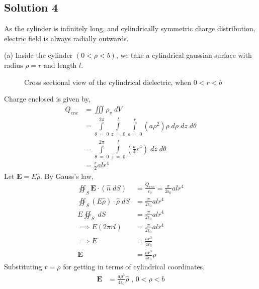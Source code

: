 \documentclass[12pt]{article}
\providecommand{\brak}[1]{\ensuremath{\left(#1\right)}}
\begin{document}
\subsection*{Solution 4}
As the cylinder is infinitely long, and cylindrically symmetric charge distribution, electric field is always radially outwards. 

(a) Inside the cylinder $\brak{0 < \rho < b}$, we take a cylindrical gaussian surface with radius $\rho = r$ and length $l$.
\begin{figure}[!ht]
\centering
{}%

\label{fig:my_label}
\caption{Cross sectional view of the cylindrical dielectric, when $0 < r < b$}
\end{figure}
Charge enclosed is given by,
\begin{align*}
    Q_{enc} &= \iiint \rho_v \;dV\\
    &= \int\limits_{\theta \;=\; 0}^{2\pi} \int\limits_{z \;=\; 0}^{l} \int\limits_{\rho \;=\; 0}^{r} \brak{a\rho^2} \rho \;d\rho \;dz \;d\theta\\
    &= \int\limits_{\theta \;=\; 0}^{2\pi} \int\limits_{z \;=\; 0}^{l} \brak{\frac{a}{4}r^4}\;dz \;d\theta\\
    &= \frac{\pi}{2} alr^4
\end{align*}
Let $\mathbf{E} = E\hat{\rho}$. By Gauss's law,
\begin{align*}
    \oiint_S \mathbf{E}\cdot\brak{\hat{n}\;dS} &= \frac{Q_{enc}}{\epsilon_0} = \frac{\pi}{2\epsilon_0} alr^4\\
    \oiint_S \brak{E \hat{\rho}}\cdot\hat{\rho}\;dS &= \frac{\pi}{2\epsilon_0} alr^4\\
    E \oiint_S \;dS &= \frac{\pi}{2\epsilon_0} alr^4\\
    \implies E \brak{2\pi rl} &= \frac{\pi}{2\epsilon_0} alr^4\\
    \implies E &= \frac{ar^3}{4\epsilon_0}\\
    \mathbf{E} &=  \frac{ar^3}{4\epsilon_0} \hat{\rho}
\end{align*}
Substituting $r = \rho$ for getting in terms of cylindrical coordinates,
\begin{align*}
    \mathbf{E} &= \frac{a{\rho}^3}{4\epsilon_0} \hat{\rho} \text{ , } 0 < \rho < b
\end{align*}
\end{document}
